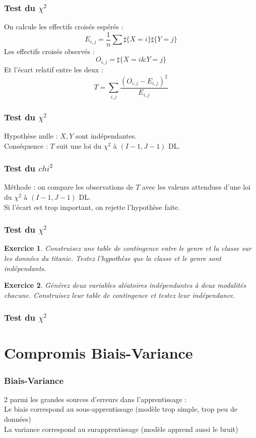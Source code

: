\documentclass[11pt]{beamer}
\newenvironment{slide}[1]{%
\begin{frame}[environment=slide]
\frametitle{#1}
}{%
\end{frame}
}
\newtheorem{exercice}{Exercice}
\newcommand{\Pythonsmall}[1]{
	{\scriptsize }
}
\begin{document}
\begin{slide}{Test du $\chi^2$}
On calcule les effectifs croisés espérés :
$$E_{i,j} = \frac{1}{n}\sum \sharp\{X=i\}\sharp\{Y=j\}$$
\pause
Les effectifs croisés observés :
$$O_{i,j} =  \sharp\{X=i \& Y=j\}$$
\pause
Et l'écart relatif entre les deux :
$$ T = \sum_{i,j}\frac{(O_{i,j}-E_{i,j})^2}{E_{i,j}}$$
\end{slide}


\begin{slide}{Test du $\chi^2$}
Hypothèse nulle : $X,Y$ sont indépendantes.\\
\pause
\vspace{0.2cm}Conséquence : $T$ suit une loi du $\chi^2$ à $(I-1,J-1)$ DL.

\end{slide}



\begin{slide}{Test du $chi^2$}
Méthode : on compare les observations de $T$ avec les valeurs attendues d'une loi du $\chi^2$ à $(I-1,J-1)$ DL.\\
\pause
\vspace{0.2cm} Si l'écart est trop important, on rejette l'hypothèse faite.
\end{slide}

\begin{slide}{Test du $\chi^2$}
\begin{exercice}
Construisez une table de contingence entre le genre et la classe sur les données du titanic. Testez l'hypothèse que la classe et le genre sont indépendants.
\end{exercice}
\begin{exercice}
Générez deux variables aléatoires indépendantes à deux modalités chacune. Construisez leur table de contingence et testez leur indépendance.
\end{exercice}
\end{slide}

\begin{slide}{Test du $\chi^2$}

\Pythonsmall{ex902}
\end{slide}


\section{Compromis Biais-Variance}

\begin{slide}{Biais-Variance}
2 parmi les grandes sources d'erreurs dans l'apprentissage :\\
\pause
\vspace{0.2cm}Le biais correspond au sous-apprentissage (modèle trop simple, trop peu de données)\\
\pause
\vspace{0.2cm}La variance correspond au surapprentissage (modèle apprend aussi le bruit)
\end{slide}
\end{document}
